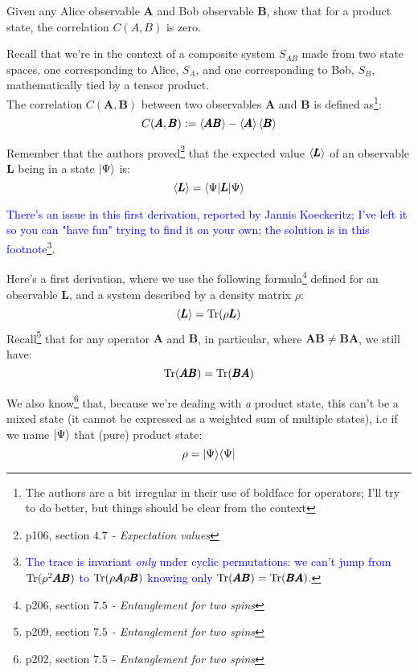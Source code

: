 \documentclass[solutions.tex]{subfiles}
\begin{document}
\maketitle
\begin{exercise} Given any Alice observable $\bm{A}$ and Bob observable
$\bm{B}$, show that for a product state, the correlation $C(A, B)$ is zero.
\end{exercise}

Recall that we're in the context of a composite system $S_{AB}$ made from two
state spaces, one corresponding to Alice, $S_A$, and one corresponding to Bob,
$S_B$, mathematically tied by a tensor product. \\

The correlation $C(\bm{A}, \bm{B})$ between two observables $\bm{A}$ and $\bm{B}$
is defined as\footnote{The authors are a bit irregular in their use of boldface
for operators; I'll try to do better, but things should be clear from the context}:
\[
	C(\pmb{A}, \pmb{B}) := \left\langle \pmb{AB} \right\rangle - \left\langle \pmb{A} \right\rangle\left\langle \pmb{B} \right\rangle
\]

Remember that the authors proved\footnote{p106, section \textit{%
$4.7$ - Expectation values}} that the expected value
$\left\langle \pmb{L} \right\rangle$ of an observable $\bm{L}$ being
in a state $|\Psi\rangle$ is:
\[
	\left\langle \pmb{L} \right\rangle = \langle \Psi|\pmb{L}|\Psi\rangle
\]

\hr
\textcolor{blue}{\begin{remark}
There's an issue in this first derivation, reported by Jannis
Koeckeritz; I've left it so you can "have fun" trying to find it on your own;
the solution is in this footnote\footnote{\textcolor{blue}{The trace is invariant
\textit{only} under cyclic permutations: we can't jump from $\text{Tr}(\rho^2\pmb{A}\pmb{B})$
to $\text{Tr}(\rho\pmb{A}\rho\pmb{B})$ knowing only $\text{Tr}(\pmb{AB}) = \text{Tr}(\pmb{BA})$.}}.
\end{remark}}

Here's a first derivation, where we use the following formula\footnote{p206,
section \textit{$7.5$ - Entanglement for two spins}} defined for an
observable $\bm{L}$, and a system described by a density matrix $\rho$:
\[
	\left\langle \pmb{L} \right\rangle = \text{Tr}(\rho\pmb{L})
\]
Recall\footnote{p209, section \textit{$7.5$ - Entanglement for two spins}}
 that for any operator $\bm{A}$ and $\bm{B}$, in particular,
where $\bm{AB} \neq \bm{BA}$, we still have:
\[
	\text{Tr}(\pmb{AB}) = \text{Tr}(\pmb{BA})
\]

We also know\footnote{p202, section \textit{$7.5$ - Entanglement for two spins}}
that, because we're dealing with \textit{a} product state, this can't be
a mixed state (it cannot be expressed as a weighted sum of multiple
states), i.e if we name $|\Psi\rangle$ that (pure) product state:
\[
	\rho = |\Psi\rangle\langle \Psi|
\]
\end{document}
